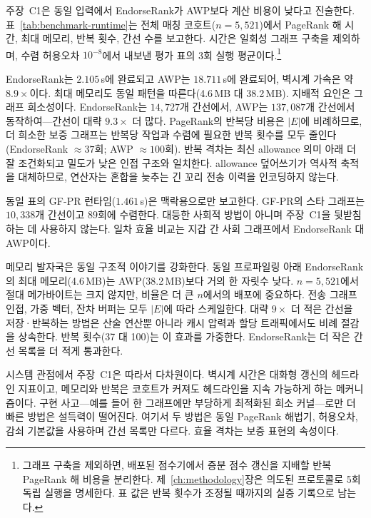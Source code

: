 주장~C1은 동일 입력에서 EndorseRank가 AWP보다 계산 비용이 낮다고 진술한다. 표~\ref{tab:benchmark-runtime}는 전체 매칭 코호트($n=5{,}521$)에서 PageRank 해 시간, 최대 메모리, 반복 횟수, 간선 수를 보고한다. 시간은 일회성 그래프 구축을 제외하며, 수렴 허용오차 $10^{-8}$에서 내보낸 평가 표의 3회 실행 평균이다.\footnote{그래프 구축을 제외하면, 배포된 점수기에서 증분 점수 갱신을 지배할 반복 PageRank 해 비용을 분리한다. 제~\ref{ch:methodology}장은 의도된 프로토콜로 5회 독립 실행을 명세한다. 표 값은 반복 횟수가 조정될 때까지의 실증 기록으로 남는다.}



EndorseRank는 $2.105$\,s에 완료되고 AWP는 $18.711$\,s에 완료되어, 벽시계 가속은 약 $8.9\times$이다. 최대 메모리도 동일 패턴을 따른다(4.6\,MB 대 38.2\,MB). 지배적 요인은 그래프 희소성이다. EndorseRank는 $14{,}727$개 간선에서, AWP는 $137{,}087$개 간선에서 동작하여---간선이 대략 $9.3\times$ 더 많다. PageRank의 반복당 비용은 $|E|$에 비례하므로, 더 희소한 보증 그래프는 반복당 작업과 수렴에 필요한 반복 횟수를 모두 줄인다(EndorseRank $\approx 37$회; AWP $\approx 100$회). 반복 격차는 최신 allowance 의미 아래 더 잘 조건화되고 밀도가 낮은 인접 구조와 일치한다. allowance 덮어쓰기가 역사적 축적을 대체하므로, 연산자는 혼합을 늦추는 긴 꼬리 전송 이력을 인코딩하지 않는다.

동일 표의 GF-PR 런타임($1.461$\,s)은 맥락용으로만 보고한다. GF-PR의 스타 그래프는 $10{,}338$개 간선이고 $89$회에 수렴한다. 대등한 사회적 방법이 아니며 주장~C1을 뒷받침하는 데 사용하지 않는다. 일차 효율 비교는 지갑 간 사회 그래프에서 EndorseRank 대 AWP이다.

메모리 발자국은 동일 구조적 이야기를 강화한다. 동일 프로파일링 아래 EndorseRank의 최대 메모리(4.6\,MB)는 AWP(38.2\,MB)보다 거의 한 자릿수 낮다. $n=5{,}521$에서 절대 메가바이트는 크지 않지만, 비율은 더 큰 $n$에서의 배포에 중요하다. 전송 그래프 인접, 가중 벡터, 잔차 버퍼는 모두 $|E|$에 따라 스케일한다. 대략 $9\times$ 더 적은 간선을 저장·반복하는 방법은 산술 연산뿐 아니라 캐시 압력과 할당 트래픽에서도 비례 절감을 상속한다. 반복 횟수(37 대 100)는 이 효과를 가중한다. EndorseRank는 더 작은 간선 목록을 더 적게 통과한다.

시스템 관점에서 주장~C1은 따라서 다차원이다. 벽시계 시간은 대화형 갱신의 헤드라인 지표이고, 메모리와 반복은 코호트가 커져도 헤드라인을 지속 가능하게 하는 메커니즘이다. 구현 사고---예를 들어 한 그래프에만 부당하게 최적화된 희소 커널---로만 더 빠른 방법은 설득력이 떨어진다. 여기서 두 방법은 동일 PageRank 해법기, 허용오차, 감쇠 기본값을 사용하며 간선 목록만 다르다. 효율 격차는 보증 표현의 속성이다.

